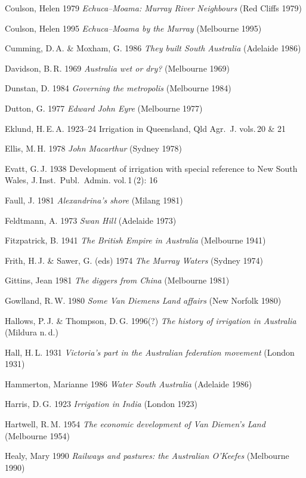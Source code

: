 Coulson, Helen 1979 \textsl{Echuca--Moama: Murray River Neighbours}
(Red Cliffs 1979)

Coulson, Helen 1995 \textsl{Echuca--Moama by the Murray} (Melbourne
1995)

Cumming, D.\,A. \& Moxham, G. 1986 \textsl{They built South Australia}
(Adelaide 1986)

Davidson, B.\,R. 1969 \textsl{Australia wet or dry?} (Melbourne 1969)

Dunstan, D. 1984 \textsl{Governing the metropolis} (Melbourne 1984)

Dutton, G. 1977 \textsl{Edward John Eyre} (Melbourne 1977)

Eklund, H.\,E.\,A. 1923--24 Irrigation in Queensland, Qld Agr.\
J. vols.\,20 \& 21

Ellis, M.\,H. 1978 \textsl{John Macarthur} (Sydney 1978)

Evatt, G.\,J. 1938 Development of irrigation with special reference to
New South Wales, J.\,Inst.\ Publ.\ Admin. vol.\,1\,(2): 16

Faull, J. 1981 \textsl{Alexandrina's shore} (Milang 1981)

Feldtmann, A. 1973 \textsl{Swan Hill} (Adelaide 1973)

Fitzpatrick, B. 1941 \textsl{The British Empire in Australia}
(Melbourne 1941)

Frith, H.\,J. \& Sawer, G. (eds) 1974 \textsl{The Murray Waters}
(Sydney 1974)

Gittins, Jean 1981 \textsl{The diggers from China} (Melbourne 1981)

Gowlland, R.\,W. 1980 \textsl{Some Van Diemens Land affairs} (New
Norfolk 1980)

Hallows, P.\,J. \& Thompson, D.\,G.  1996(?) \textsl{The history of
irrigation in Australia} (Mildura n.\,d.)

Hall, H.\,L.  1931 \textsl{Victoria's part in the Australian
federation movement} (London 1931)

Hammerton, Marianne 1986 \textsl{Water South Australia} (Adelaide
1986)

Harris, D.\,G. 1923 \textsl{Irrigation in India} (London 1923)

Hartwell, R.\,M. 1954 \textsl{The economic development of Van Diemen's
Land} (Melbourne 1954)

Healy, Mary 1990 \textsl{Railways and pastures: the Australian
O'Keefes} (Melbourne 1990)

